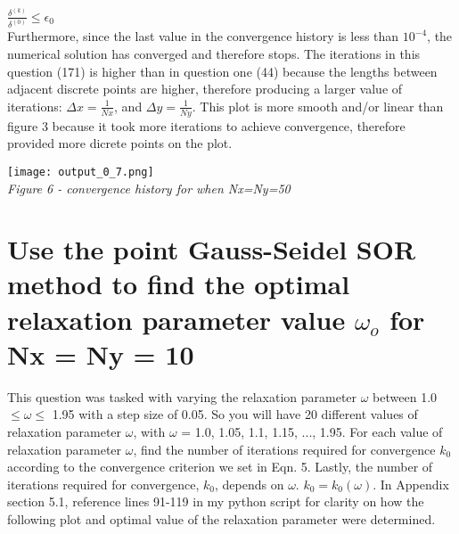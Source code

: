 \documentclass[a4paper, twoside]{article}
\begin{document}
$\frac{\delta^{(k)}}{\delta^{(0)}} \leq \epsilon_0 $ \\

Furthermore, since the last value in the convergence history is less than $10^{-4}$, the numerical solution has converged and therefore stops. The iterations in this question (171) is higher than in question one (44) because the lengths between adjacent discrete points are higher, therefore producing a larger value of iterations: $\Delta x = \frac{1}{Nx}$, and $\Delta y = \frac{1}{Ny}$. This plot is more smooth and/or linear than figure 3 because it took more iterations to achieve convergence, therefore provided more dicrete points on the plot. 

\begin{center}
    \texttt{[image: output\_0\_7.png]} \\
    \textit{Figure 6 - convergence history for when Nx=Ny=50}
\end{center}

\newpage 
\section{Use the point Gauss-Seidel SOR method to find the optimal relaxation parameter value $\omega_o$ for Nx = Ny = 10}
This question was tasked with varying the relaxation parameter $\omega$ between 1.0 $\leq \omega \leq $ 1.95 with a step size of 0.05. So you will have 20 different values of relaxation parameter $\omega$, with $\omega$ = 1.0, 1.05, 1.1, 1.15, ..., 1.95. For each value of relaxation parameter $\omega$, find the number of iterations required for convergence $k_0$ according to the convergence criterion we set in Eqn. 5. Lastly, the number of iterations required for convergence, $k_0$, depends on $\omega$. $k_0 = k_0(\omega)$. In Appendix section 5.1, reference lines 91-119 in my python script for clarity on how the following plot and optimal value of the relaxation parameter were determined.
\end{document}
